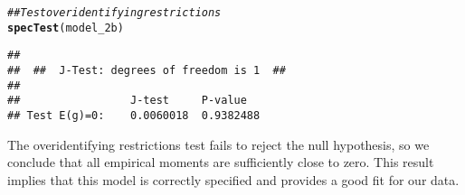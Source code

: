 \documentclass[11pt,letterpaper]{article}\usepackage[]{graphicx}\usepackage[]{color}
\makeatletter
\newcommand{\hlcom}[1]{\textcolor[rgb]{0.678,0.584,0.686}{\textit{#1}}}%
\newcommand{\hlstd}[1]{\textcolor[rgb]{0.345,0.345,0.345}{#1}}%
\newcommand{\hlkwd}[1]{\textcolor[rgb]{0.737,0.353,0.396}{\textbf{#1}}}%
\newenvironment{kframe}{%
 \def\at@end@of@kframe{}%
 \ifinner\ifhmode%
  \def\at@end@of@kframe{\end{minipage}}%
  \begin{minipage}{\columnwidth}%
 \fi\fi%
 \def\FrameCommand##1{\hskip\@totalleftmargin \hskip-\fboxsep
 \colorbox{shadecolor}{##1}\hskip-\fboxsep
     \hskip-\linewidth \hskip-\@totalleftmargin \hskip\columnwidth}%
 \MakeFramed {\advance\hsize-\width
   \@totalleftmargin\z@ \linewidth\hsize
   \@setminipage}}%
 {\par\unskip\endMakeFramed%
 \at@end@of@kframe}
\newenvironment{knitrout}{}{} %
\makeatother
\begin{document}
\begin{enumerate}[label=\alph*., leftmargin=*]
\begin{enumerate}[label=\roman*.]
\begin{knitrout}
\color{fgcolor}\begin{kframe}
\begin{alltt}
\hlcom{## Test overidentifying restrictions}
\hlkwd{specTest}\hlstd{(model_2b)}
\end{alltt}
\begin{verbatim}
## 
##  ##  J-Test: degrees of freedom is 1  ## 
## 
##                 J-test     P-value  
## Test E(g)=0:    0.0060018  0.9382488
\end{verbatim}
\end{kframe}
\end{knitrout}

		The overidentifying restrictions test fails to reject the null hypothesis, so we conclude that all empirical moments are sufficiently close to zero. This result implies that this model is correctly specified and provides a good fit for our data.
	\end{enumerate}
\end{enumerate}
\end{document}

